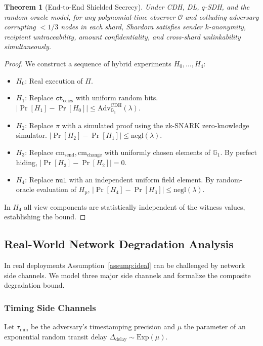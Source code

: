 \documentclass[sigconf,nonacm]{acmart}
\newtheorem{theorem}{Theorem}
\begin{document}
\begin{theorem}[End-to-End Shielded Secrecy]\label{thm:main_secrecy}
Under CDH, DL, $q$-SDH, and the random oracle model, for any polynomial-time observer $\mathcal{O}$ and colluding adversary corrupting $< 1/3$ nodes in each shard, Shardora satisfies sender $k$-anonymity, recipient untraceability, amount confidentiality, and cross-shard unlinkability simultaneously.
\end{theorem}

\begin{proof}
We construct a sequence of hybrid experiments $H_0, \dots, H_4$:
\begin{itemize}
    \item $H_0$: Real execution of $\Pi$.
    \item $H_1$: Replace $\mathtt{ct}_{\text{ecies}}$ with uniform random bits. $| \Pr[H_1] - \Pr[H_0] | \le \text{Adv}^{\text{CDH}}_{\mathbb{G}_1}(\lambda)$.
    \item $H_2$: Replace $\pi$ with a simulated proof using the zk-SNARK zero-knowledge simulator. $| \Pr[H_2] - \Pr[H_1] | \le \text{negl}(\lambda)$.
    \item $H_3$: Replace $\text{cm}_{\text{send}}, \text{cm}_{\text{change}}$ with uniformly chosen elements of $\mathbb{G}_1$. By perfect hiding, $| \Pr[H_3] - \Pr[H_2] | = 0$.
    \item $H_4$: Replace $\mathtt{nul}$ with an independent uniform field element. By random-oracle evaluation of $H_{\text{p}}$, $| \Pr[H_4] - \Pr[H_3] | \le \text{negl}(\lambda)$.
\end{itemize}
In $H_4$ all view components are statistically independent of the witness values, establishing the bound.
\end{proof}

\subsection{Real-World Network Degradation Analysis}
In real deployments Assumption~\ref{assump:ideal} can be challenged by network side channels. We model three major side channels and formalize the composite degradation bound.

\subsubsection{Timing Side Channels}
Let $\tau_{\min}$ be the adversary's timestamping precision and $\mu$ the parameter of an exponential random transit delay $\Delta_{\text{delay}} \sim \text{Exp}(\mu)$.
\end{document}

